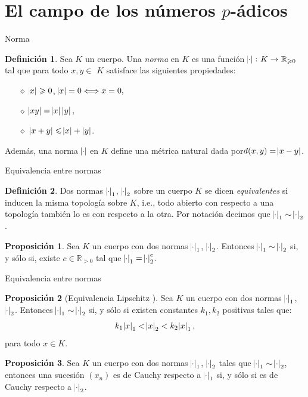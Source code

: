 \documentclass{beamer}
\newcommand{\bb}[1]{\mathbb{#1}}
\theoremstyle{definition}
\numberwithin{equation}{section}
\newcommand{\marine}[1]{\textcolor{defColor}{#1}}
\newcommand{\orangee}[1]{\textcolor{thColor}{#1}}
\newtheorem{df}{\marine{Definición}}
\newtheorem{pr}{\orangee{Proposición}}
\newcommand{\tit}[1]{\textit{#1}}
\renewcommand{\geq}{\geqslant}
\renewcommand{\leq}{\leqslant}
\newcommand{\R}{\mathbb{R}}
\begin{document}
\section{El campo de los números $p$-ádicos}
\begin{frame}{Norma}
\begin{df}\label{pnorm}
	Sea $K$ un cuerpo. Una \textit{norma} en $K$ es una función
	$\abs{\cdot}\colon K \to \R_{\geq 0}$ tal que para todo $x,y\in$ $K$
	satisface las siguientes propiedades:
	
	\begin{itemize}[<+- | alert@+>]
		\item[$\diamond$] $\abs{x} \geq0$, $\abs{x}
		=0\Longleftrightarrow x=0,$
		
		\item[$\diamond$] $\abs{xy}  =\abs{x} \left\vert 
		y\right\vert ,$
		
		\item[$\diamond$] $\left\vert x+y\right\vert \leq\abs{x} +\left\vert y\right\vert$.
	\end{itemize}
\end{df}
	Además, una norma $\abs{\cdot}$ en $K$ define una métrica natural dada por\linebreak ${d (x,y)=\abs{x-y}}$.
\end{frame}
\begin{frame}{Equivalencia entre normas}
\begin{df}
	Dos normas $\abs{\cdot}_1$, $\abs{\cdot}_2$ sobre un cuerpo $K$ se dicen \tit{equivalentes }si inducen la misma topología sobre $K$, i.e., todo abierto con respecto a una  topología también  lo es con respecto a la otra. Por notación decimos que $\abs{\cdot}_1\sim\abs{\cdot}_2$.
\end{df}

\begin{pr}\label{quiv_power}
	Sea $K$ un cuerpo con dos normas $\abs{\cdot}_1$, $\abs{\cdot}_2$. Entonces \linebreak$\abs{\cdot}_1\sim\abs{\cdot}_2$ si, y sólo si, existe $c\in\bb{R}_{>0}$ tal que $\abs{\cdot}_1=\abs{\cdot}_2^c$.
\end{pr}
\end{frame}
\begin{frame}{Equivalencia entre normas}
\begin{pr}
	[Equivalencia Lipschitz ]\label{lipeq}
	Sea $K$ un cuerpo con dos normas $\abs{\cdot}_1$, $\abs{\cdot}_2$. Entonces $\abs{\cdot}_1\sim\abs{\cdot}_2$ si, y sólo si existen constantes $k_1,k_2$ positivas tales que:
	$$k_1\abs{x}_1<\abs{x}_2< k_2\abs{x}_1,$$
	para todo $x\in K$.
\end{pr}
\begin{pr}
	\label{equiv_cauchy}
	Sea $K$ un cuerpo con dos normas $\abs{\cdot}_1$, $\abs{\cdot}_2$ tales que ${\abs{\cdot}_1\sim\abs{\cdot}_2}$, entonces una sucesión $ (x_n)$ es de Cauchy respecto a $\abs{\cdot}_1$ si, y sólo si es de Cauchy respecto a $\abs{\cdot}_2$.
\end{pr}
\end{frame}
\end{document}
